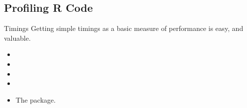 \subsection{Profiling R Code}
\makesubcontentsslidessec


\begin{frame}
  \begin{block}{Timings}
  Getting simple timings as a basic measure of performance is easy, and 
valuable.
  \begin{itemize}
    \item {}
    \item {}
    \item {}
    \item {}
    \item The  package.
  \end{itemize}
  \end{block}
\end{frame}

